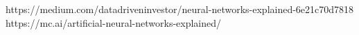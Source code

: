 https://medium.com/datadriveninvestor/neural-networks-explained-6e21c70d7818
https://mc.ai/artificial-neural-networks-explained/